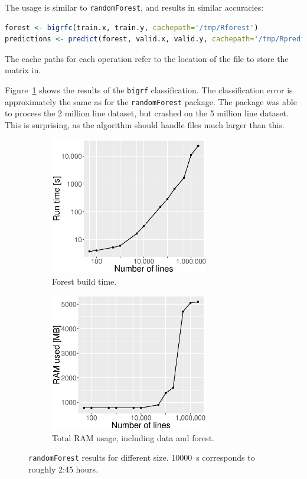 \documentclass{article}
\begin{document}
The usage is similar to \texttt{randomForest}, and results in similar accuracies:

\begin{lstlisting}[frame=single, basicstyle=\footnotesize\ttfamily, language=R]
forest <- bigrfc(train.x, train.y, cachepath='/tmp/Rforest')
predictions <- predict(forest, valid.x, valid.y, cachepath='/tmp/Rpredict')
\end{lstlisting}
The cache paths for each operation refer to the location of the file to store the matrix in.

Figure~\ref{bigrf} shows the results of the \texttt{bigrf} classification. The classification error is approximately the same as for the \texttt{randomForest} package. The package was able to process the 2 million line dataset, but crashed on the 5 million line dataset. This is surprising, as the algorithm should handle files much larger than this.

\begin{figure}[ht]
    \begin{subfigure}[t]{0.49\textwidth}
        \centering
        \includegraphics[height=6cm]{bigrf_time.eps}
        \caption{Forest build time.}
    \end{subfigure}%
    \begin{subfigure}[t]{0.49\textwidth}
        \centering
        \includegraphics[height=6cm]{bigrf_ram.eps}
        \caption{Total RAM usage, including data and forest.}
    \end{subfigure}
    \caption{\label{bigrf} \texttt{randomForest} results for different size. \SI{10000}{\second} corresponds to roughly 2:45 hours.}
\end{figure}
\end{document}
